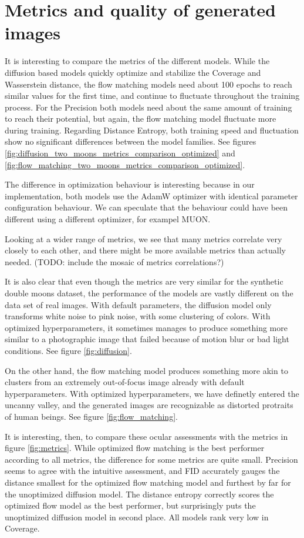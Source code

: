 \documentclass{article}
\begin{document}
\section{Metrics and quality of generated images}

It is interesting to compare the metrics of the different models. While the diffusion based models quickly optimize and stabilize the Coverage and Wasserstein distance, the flow matching models need about 100 epochs to reach similar values for the first time, and continue to fluctuate throughout the training process. For the Precision both models need about the same amount of training to reach their potential, but again, the flow matching model fluctuate more during training. Regarding Distance Entropy, both training speed and fluctuation show no significant differences between the model families. See figures \ref{fig:diffusion_two_moons_metrics_comparison_optimized} and \ref{fig:flow_matching_two_moons_metrics_comparison_optimized}.

The difference in optimization behaviour is interesting because in our implementation, both models use the AdamW optimizer with identical parameter configuration behaviour. We can speculate that the behaviour could have been different using a different optimizer, for exampel MUON.

Looking at a wider range of metrics, we see that many metrics correlate very closely to each other, and there might be more available metrics than actually needed. (TODO: include the mosaic of metrics correlations?)

It is also clear that even though the metrics are very similar for the synthetic double moons dataset, the performance of the models are vastly different on the data set of real images. With default parameters, the diffusion model only transforms white noise to pink noise, with some clustering of colors. With optimized hyperparameters, it sometimes manages to produce something more similar to a photographic image that failed because of motion blur or bad light conditions. See figure \ref{fig:diffusion}.

On the other hand, the flow matching model produces something more akin to clusters from an extremely out-of-focus image already with default hyperparameters. With optimized hyperparameters, we have definetly entered the uncanny valley, and the generated images are recognizable as distorted protraits of human beings. See figure \ref{fig:flow_matching}.

It is interesting, then, to compare these ocular assessments with the metrics in figure \ref{fig:metrics}. While optimized flow matching is the best performer according to all metrics, the difference for some metrics are quite small. Precision seems to agree with the intuitive assessment, and FID accurately gauges the distance smallest for the optimized flow matching model and furthest by far for the unoptimized diffusion model. The distance entropy correctly scores the optimized flow model as the best performer, but surprisingly puts the unoptimized diffusion model in second place. All models rank very low in Coverage.




\end{document}
